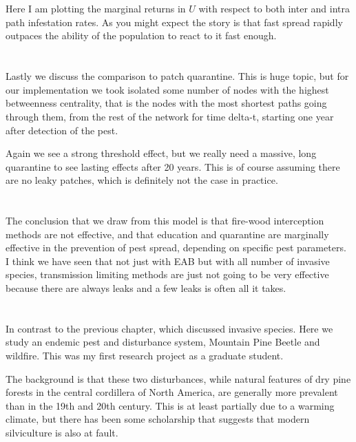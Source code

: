 \documentclass{article}
\begin{document}
\section{}

Here I am plotting the marginal returns in $U$ with respect to both inter and intra path infestation rates. As you might expect the story is that fast spread rapidly outpaces the ability of the population to react to it fast enough. 

\section{}

Lastly we discuss the comparison to patch quarantine. This is huge topic, but for our implementation we took isolated some number of nodes with the highest betweenness centrality, that is the nodes with the most shortest paths going through them, from the rest of the network for time delta-t, starting one year after detection of the pest.

Again we see a strong threshold effect, but we really need a massive, long quarantine to see lasting effects after 20 years. This is of course assuming there are no leaky patches, which is definitely not the case in practice.

\section{}

The conclusion that we draw from this model is that fire-wood interception methods are not effective, and that education and quarantine are marginally effective in the prevention of pest spread, depending on specific pest parameters. I think we have seen that not just with EAB but with all number of invasive species, transmission limiting methods are just not going to be very effective because there are always leaks and a few leaks is often all it takes. 

\section{}

In contrast to the previous chapter, which discussed invasive species. Here we study an endemic pest and disturbance system, Mountain Pine Beetle and wildfire. This was my first research project as a graduate student.

The background is that these two disturbances, while natural features of dry pine forests in the central cordillera of North America, are generally more prevalent than in the 19th and 20th century. This is at least partially due to a warming climate, but there has been some scholarship that suggests that modern silviculture is also at fault. 
\end{document}
